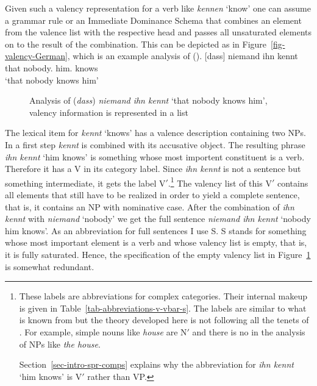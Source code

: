 Given such a valency representation for a verb like \emph{kennen} `know' one can assume a grammar rule
or an Immediate Dominance Schema that combines an element from the valence list with the respective head
and passes all unsaturated elements on to the result of the combination. This can be depicted as in
Figure~\vref{fig-valency-German}, which is an example analysis of ().
\ea
\label{ex-dass-niemand-ihn-kennt}
\gll  {}[dass] niemand ihn kennt\\
      \spacebr{}that nobody.\nom{} him.\acc{} knows\\ 
\glt `that nobody knows him'
\z
\begin{figure}
\caption{\label{fig-valency-German}Analysis of (\emph{dass}) \emph{niemand ihn kennt} `that nobody
  knows him', valency information is represented in a list}
\end{figure}

The lexical item for \emph{kennt} `knows' has a valence description containing two NPs. In a first
step \emph{kennt} is combined with its accusative object. The resulting phrase \emph{ihn kennt} `him
knows' is something whose most importent constituent is a verb. Therefore it has a V in its category
label. Since \emph{ihn kennt} is not a sentence but something intermediate, it gets the label
V$'$.\footnote{%
  These labels are abbreviations for complex categories. Their internal makeup is given in
  Table~\ref{tab-abbreviations-v-vbar-s}. The labels are similar to what is known from \xbart but
  the theory developed here is not following all the tenets of \xbart. For example, simple nouns
  like \emph{house} are N$'$ and there is no \nnull in the analysis of NPs like \emph{the house}.

  Section~\ref{sec-intro-spr-comps} explains why the abbreviation for \emph{ihn kennt} `him knows' is V$'$ rather than VP.
} The valency list of this V$'$ contains all elements that still have to be realized in order to
yield a complete sentence, that is, it contains an NP with nominative case. After the combination of
\emph{ihn kennt} with \emph{niemand} `nobody' we get the full sentence \emph{niemand ihn kennt}
`nobody him knows'. As an abbreviation for full sentences I use S. S stands for something whose most
important element is a verb and whose valency list is empty, that is, it is fully saturated. Hence,
the specification of the empty valency list in Figure~\ref{fig-valency-German} is somewhat redundant.

